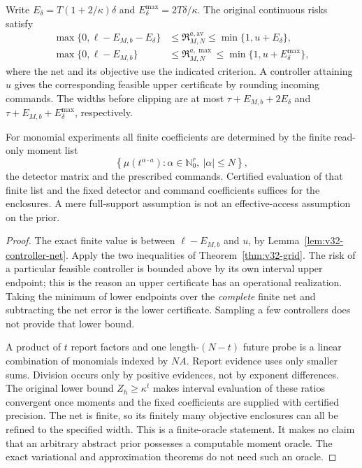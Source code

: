 \begin{theorem}\label{thm:v32-certificates}
Write $E_\delta=T(1+2/\kappa)\delta$ and
$E_\delta^{\max}=2T\delta/\kappa$. The original continuous risks satisfy
\begin{align}
 \max\{0,\ell-E_{M,b}-E_\delta\}
 &\le\mathfrak R_{M,N}^{a,\mathrm{av}}
       \le\min\{1,u+E_\delta\},\label{eq:v32-interval-av}\\
 \max\{0,\ell-E_{M,b}\}
 &\le\mathfrak R_{M,N}^{a,\max}
       \le\min\{1,u+E_\delta^{\max}\},
                         \label{eq:v32-interval-max}
\end{align}
where the net and its objective use the indicated criterion. A controller
attaining $u$ gives the corresponding feasible upper certificate by
rounding incoming commands. The widths before clipping are at most
$\tau+E_{M,b}+2E_\delta$ and
$\tau+E_{M,b}+E_\delta^{\max}$, respectively.

For monomial experiments all finite coefficients are determined by the
finite read-only moment list
\begin{equation}\label{eq:v32-moment-list}
 \left\{\mu(t^{\alpha\cdot a}):
                 \alpha\in\mathbb N_0^r,\ |\alpha|\le N\right\},
\end{equation}
the detector matrix and the prescribed commands. Certified evaluation
of that finite list and the fixed detector and command coefficients
suffices for the enclosures. A mere full-support
assumption is not an effective-access assumption on the prior.
\end{theorem}
\begin{proof}
The exact finite value is between $\ell-E_{M,b}$ and $u$, by
Lemma~\ref{lem:v32-controller-net}. Apply the two inequalities of
Theorem~\ref{thm:v32-grid}. The risk of a particular feasible controller
is bounded above by its own interval upper endpoint; this is the reason
an upper certificate has an operational realization. Taking the minimum
of lower endpoints over the \emph{complete} finite net and subtracting
the net error is the lower certificate. Sampling a few controllers does
not provide that lower bound.

A product of $t$ report factors and one length-$(N-t)$ future probe is
a linear combination of monomials indexed by $NA$. Report evidence uses
only smaller sums. Division occurs only by positive evidences, not by
exponent differences. The original lower bound $Z_h\ge\kappa^t$ makes
interval evaluation of these ratios convergent once moments and the
fixed coefficients are supplied with certified precision. The net is
finite, so its finitely many objective enclosures can all be refined to
the specified width. This is a finite-oracle statement. It makes no
claim that an arbitrary abstract prior possesses a computable moment
oracle. The exact variational and approximation theorems do not need
such an oracle.
\end{proof}

